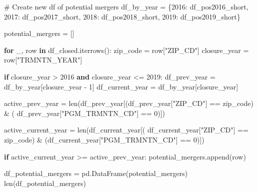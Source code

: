 \documentclass[
  letterpaper,
  DIV=11,
  numbers=noendperiod]{scrartcl}
\newenvironment{Shaded}{\begin{snugshade}}{\end{snugshade}}
\newcommand{\BuiltInTok}[1]{\textcolor[rgb]{0.00,0.23,0.31}{#1}}
\newcommand{\CommentTok}[1]{\textcolor[rgb]{0.37,0.37,0.37}{#1}}
\newcommand{\ControlFlowTok}[1]{\textcolor[rgb]{0.00,0.23,0.31}{\textbf{#1}}}
\newcommand{\DecValTok}[1]{\textcolor[rgb]{0.68,0.00,0.00}{#1}}
\newcommand{\KeywordTok}[1]{\textcolor[rgb]{0.00,0.23,0.31}{\textbf{#1}}}
\newcommand{\NormalTok}[1]{\textcolor[rgb]{0.00,0.23,0.31}{#1}}
\newcommand{\OperatorTok}[1]{\textcolor[rgb]{0.37,0.37,0.37}{#1}}
\newcommand{\StringTok}[1]{\textcolor[rgb]{0.13,0.47,0.30}{#1}}
\begin{document}
\begin{Shaded}
\begin{Highlighting}[]
\CommentTok{\# Create new df of potential mergers}
\NormalTok{df\_by\_year }\OperatorTok{=}\NormalTok{ \{}\DecValTok{2016}\NormalTok{: df\_pos2016\_short, }\DecValTok{2017}\NormalTok{: df\_pos2017\_short,}
              \DecValTok{2018}\NormalTok{: df\_pos2018\_short, }\DecValTok{2019}\NormalTok{: df\_pos2019\_short\}}

\NormalTok{potential\_mergers }\OperatorTok{=}\NormalTok{ []}

\ControlFlowTok{for}\NormalTok{ \_, row }\KeywordTok{in}\NormalTok{ df\_closed.iterrows():}
\NormalTok{    zip\_code }\OperatorTok{=}\NormalTok{ row[}\StringTok{"ZIP\_CD"}\NormalTok{]}
\NormalTok{    closure\_year }\OperatorTok{=}\NormalTok{ row[}\StringTok{"TRMNTN\_YEAR"}\NormalTok{]}

    \ControlFlowTok{if}\NormalTok{ closure\_year }\OperatorTok{\textgreater{}} \DecValTok{2016} \KeywordTok{and}\NormalTok{ closure\_year }\OperatorTok{\textless{}=} \DecValTok{2019}\NormalTok{:}
\NormalTok{        df\_prev\_year }\OperatorTok{=}\NormalTok{ df\_by\_year[closure\_year }\OperatorTok{{-}} \DecValTok{1}\NormalTok{]}
\NormalTok{        df\_current\_year }\OperatorTok{=}\NormalTok{ df\_by\_year[closure\_year]}

\NormalTok{        active\_prev\_year }\OperatorTok{=} \BuiltInTok{len}\NormalTok{(df\_prev\_year[(df\_prev\_year[}\StringTok{"ZIP\_CD"}\NormalTok{] }\OperatorTok{==}\NormalTok{ zip\_code) }\OperatorTok{\&}\NormalTok{ (}
\NormalTok{            df\_prev\_year[}\StringTok{"PGM\_TRMNTN\_CD"}\NormalTok{] }\OperatorTok{==} \DecValTok{0}\NormalTok{)])}

\NormalTok{        active\_current\_year }\OperatorTok{=} \BuiltInTok{len}\NormalTok{(df\_current\_year[(}
\NormalTok{            df\_current\_year[}\StringTok{"ZIP\_CD"}\NormalTok{] }\OperatorTok{==}\NormalTok{ zip\_code) }\OperatorTok{\&}\NormalTok{ (df\_current\_year[}\StringTok{"PGM\_TRMNTN\_CD"}\NormalTok{] }\OperatorTok{==} \DecValTok{0}\NormalTok{)])}

        \ControlFlowTok{if}\NormalTok{ active\_current\_year }\OperatorTok{\textgreater{}=}\NormalTok{ active\_prev\_year:}
\NormalTok{            potential\_mergers.append(row)}

\NormalTok{df\_potential\_mergers }\OperatorTok{=}\NormalTok{ pd.DataFrame(potential\_mergers)}
\BuiltInTok{len}\NormalTok{(df\_potential\_mergers)}
\end{Highlighting}
\end{Shaded}
\end{document}
